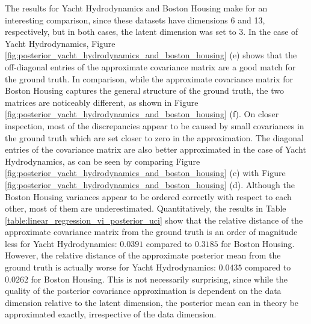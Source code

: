 \documentclass[10pt]{article} %
\begin{document}
The results for Yacht Hydrodynamics and Boston Housing make for an interesting comparison, since these datasets have dimensions 6 and 13, respectively, but in both cases, the latent dimension was set to 3. In the case of Yacht Hydrodynamics, Figure \ref{fig:posterior_yacht_hydrodynamics_and_boston_housing} (e) shows that the off-diagonal entries of the approximate covariance matrix are a good match for the ground truth. In comparison, while the approximate covariance matrix for Boston Housing captures the general structure of the ground truth, the two matrices are noticeably different, as shown in Figure \ref{fig:posterior_yacht_hydrodynamics_and_boston_housing} (f). On closer inspection, most of the discrepancies appear to be caused by small covariances in the ground truth which are set closer to zero in the approximation. The diagonal entries of the covariance matrix are also better approximated in the case of Yacht Hydrodynamics, as can be seen by comparing Figure \ref{fig:posterior_yacht_hydrodynamics_and_boston_housing} (c) with Figure \ref{fig:posterior_yacht_hydrodynamics_and_boston_housing} (d). Although the Boston Housing variances appear to be ordered correctly with respect to each other, most of them are underestimated. Quantitatively, the results in Table \ref{table:linear_regression_vi_posterior_uci} show that the relative distance of the approximate covariance matrix from the ground truth is an order of magnitude less for Yacht Hydrodynamics: $0.0391$ compared to $0.3185$ for Boston Housing. However, the relative distance of the approximate posterior mean from the ground truth is actually worse for Yacht Hydrodynamics: $0.0435$ compared to $0.0262$ for Boston Housing. This is not necessarily surprising, since while the quality of the posterior covariance approximation is dependent on the data dimension relative to the latent dimension, the posterior mean can in theory be approximated exactly, irrespective of the data dimension. 
\end{document}
